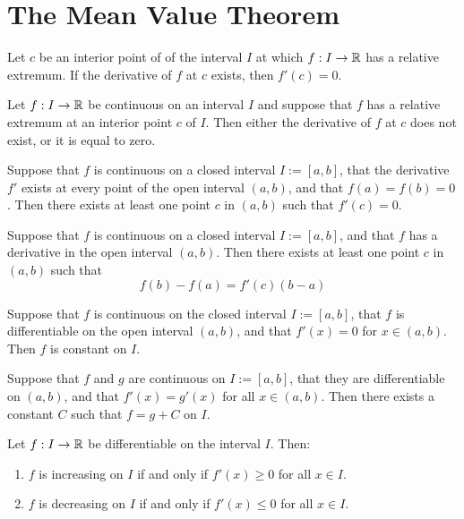 \section{The Mean Value Theorem}

\begin{theorem}
	Let $c$ be an interior point of of the interval $I$ at which $f:I \rightarrow \mathbb{R}$ has a relative extremum. If the derivative of $f$ at $c$ exists, then $f'(c)=0$.
\end{theorem}

\begin{corollary}
	Let $f:I \rightarrow \mathbb{R}$ be continuous on an interval $I$ and suppose that $f$ has a relative extremum at an interior point $c$ of $I$. Then either the derivative of $f$ at $c$ does not exist, or it is equal to zero.
\end{corollary}

\begin{theorem}
	Suppose that $f$ is continuous on a closed interval $I:= [a,b]$, that the derivative $f'$ exists at every point of the open interval $(a,b)$, and that $f(a)=f(b)=0$. Then there exists at least one point $c$ in $(a,b)$ such that $f'(c)=0$.
\end{theorem}

\begin{theorem}
	Suppose that $f$ is continuous on a closed interval $I:=[a,b]$, and that $f$ has a derivative in the open interval $(a,b)$. Then there exists at least one point $c$ in $(a,b)$ such that
	\[f(b)-f(a)=f'(c)(b-a)\]
\end{theorem}

\begin{theorem}
	Suppose that $f$ is continuous on the closed interval $I:= [a,b]$, that $f$ is differentiable on the open interval $(a,b)$, and that $f'(x)=0$ for $x \in (a,b)$. Then $f$ is constant on $I$.
\end{theorem}

\begin{corollary}
	Suppose that $f$ and $g$ are continuous on $I:=[a,b]$, that they are differentiable on $(a,b)$, and that $f'(x)=g'(x)$ for all $x \in (a,b)$. Then there exists a constant $C$ such that $f = g+C$ on $I$.
\end{corollary}

\begin{theorem}
	Let $f:I \rightarrow \mathbb{R}$ be differentiable on the interval $I$. Then:
	\begin{enumerate}
		\item $f$ is increasing on $I$ if and only if $f'(x) \geq 0$ for all $x \in I$.
		\item $f$ is decreasing on $I$ if and only if $f'(x) \leq 0$ for all $x \in I$.
	\end{enumerate}
\end{theorem}

